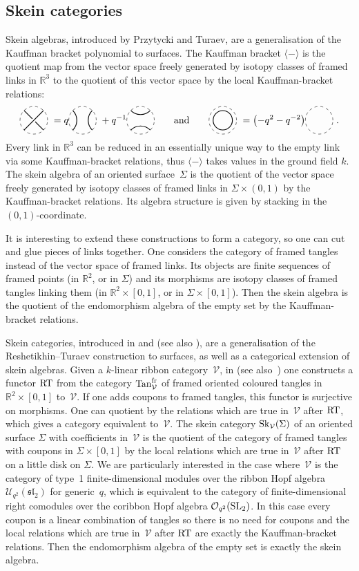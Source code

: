 \documentclass[pdftex]{sigma}%
\numberwithin{equation}{section}
\newcommand{\Kaufhoriz}{\begin{tikzpicture}[scale = 0.5, baseline = -3pt]
\draw[dashed] (0,0) circle(1);
\draw[thick] (45:1) arc (-45:-135:1);
\draw[thick] (-45:1) arc (45:135:1);
\end{tikzpicture}}
\newcommand{\Kaufvert}{\begin{tikzpicture}[scale = 0.5, baseline = -3pt]
\draw[dashed] (0,0) circle(1);
\draw[thick] (45:1) arc (135:225:1);
\draw[thick] (135:1) arc (45:-45:1);
\end{tikzpicture}}
\newcommand{\Kauftresse}{\begin{tikzpicture}[scale = 0.5, baseline = -3pt]
\draw[dashed] (0,0) circle(1);
\draw[thick] (-45:1) -- (135:1) node[fill, color= white, pos = 0.5, circle, scale = 0.45]{};
\draw[thick] (45:1) -- (-135:1);
\end{tikzpicture}}
\newcommand{\Kaufcirc}{\begin{tikzpicture}[scale = 0.5, baseline = -3pt]
\draw[dashed] (0,0) circle(1);
\draw[thick] (0,0) circle(0.7);
\end{tikzpicture}}
\newcommand{\Kaufvide}{\begin{tikzpicture}[scale = 0.5, baseline = -3pt]
\draw[dashed] (0,0) circle(1);
\end{tikzpicture}}
\newcommand{\Oq}{\mathcal{O}_{q^2}({\rm SL}_2)}
\newcommand{\Uq}{\mathcal{U}_{q^2}(\mathfrak{sl}_2)}
\begin{document}
\subsection*{Skein categories} Skein algebras, introduced by Przytycki and Turaev, are a generalisation of the Kauffman bracket polynomial to surfaces. The Kauffman bracket $\langle-\rangle$ is the quotient map from the vector space freely generated by isotopy classes of framed links in $\mathbb{R}^3$ to the quotient of this vector space by the local Kauffman-bracket relations:
\[ \Kauftresse \ = q \Kaufvert\ +q^{-1} \Kaufhoriz \qquad \text{and} \qquad \Kaufcirc \ = \big({-}q^2-q^{-2}\big) \Kaufvide\ . \]
Every link in $\mathbb{R}^3$ can be reduced in an essentially unique way to the empty link via some Kauffman-bracket relations, thus $\langle-\rangle$ takes values in the ground field $k$. The skein algebra of an oriented surface~$\Sigma$ is the quotient of the vector space freely generated by isotopy classes of framed links in $\Sigma\times (0,1)$ by the Kauffman-bracket relations. Its algebra structure is given by stacking in the $(0,1)$-coordinate.

It is interesting to extend these constructions to form a category, so one can cut and glue pieces of links together. One considers the category of framed tangles instead of the vector space of framed links. Its objects are finite sequences of framed points (in $\mathbb{R}^2$, or in $\Sigma$) and its morphisms are isotopy classes of framed tangles linking them (in $\mathbb{R}^2\times [0,1]$, or in $\Sigma\times [0,1]$). Then the skein algebra is the quotient of the endomorphism algebra of the empty set by the Kauffman-bracket relations.

Skein categories, introduced in \cite{Walker} and \cite{JohnsonFreyd} (see also \cite{Cooke}), are a generalisation of the Reshe\-ti\-khin--Turaev construction to surfaces, as well as a categorical extension of skein algebras. Given a $k$-linear ribbon category~$\mathcal{V}$, in \cite{RT} (see also~\cite{Turaev}) one constructs a functor ${\rm RT}$ from the category ${\rm Tan}_\mathcal{V}^{\rm fr}$ of framed oriented coloured tangles in $\mathbb{R}^2\times [0,1]$ to~$\mathcal{V}$. If one adds coupons to framed tangles, this functor is surjective on morphisms. One can quotient by the relations which are true in~$\mathcal{V}$ after ${\rm RT}$, which gives a category equivalent to~$\mathcal{V}$. The skein category ${\rm Sk}_\mathcal{V}(\Sigma)$ of an oriented surface $\Sigma$ with coefficients in~$\mathcal{V}$ is the quotient of the category of framed tangles with coupons in $\Sigma\times [0,1]$ by the local relations which are true in~$\mathcal{V}$ after ${\rm RT}$ on a little disk on $\Sigma$. We are particularly interested in the case where~$\mathcal{V}$ is the category of type~1 finite-dimensional modules over the ribbon Hopf alge\-bra~$\Uq$ for gene\-ric~$q$, which is equivalent to the category of finite-dimensional right comodules over the coribbon Hopf algebra $\Oq$. In this case every coupon is a linear combination of tangles so there is no need for coupons and the local relations which are true in~$\mathcal{V}$ after ${\rm RT}$ are exactly the Kauffman-bracket relations. Then the endomorphism algebra of the empty set is exactly the skein algebra.
\end{document}

